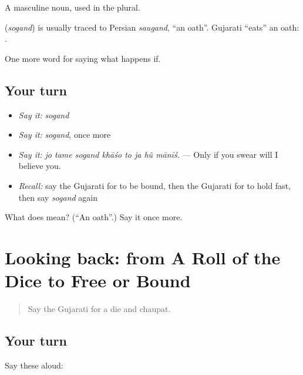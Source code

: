 A masculine noun, used in the plural.

\begin{cousinweb}
\textbf{} (\emph{sogand}) is usually traced to Persian \emph{saugand}, \textquotedblleft{}an oath\textquotedblright{}. Gujarati \textquotedblleft{}eats\textquotedblright{} an oath: \textbf{ }.
\end{cousinweb}

\begin{grammarlens}[title={What you've built}]
One more word for saying what happens if.
\end{grammarlens}

\subsection*{Your turn}
\begin{itemize}
\raggedright
  \item \emph{Say it:} \emph{sogand}
  \item \emph{Say it:} \emph{sogand}, once more
  \item \emph{Say it:} \emph{jo tame sogand khāśo to ja hũ mānīś.} — Only if you swear will I believe you.
  \item \emph{Recall:} say the Gujarati for to be bound, then the Gujarati for to hold fast, then say \emph{sogand} again
\end{itemize}

\begin{tcolorbox}[breakable,colback=teal!4,colframe=teal!35!black,title={Before you move on}]
What does  mean? (\textquotedblleft{}An oath\textquotedblright{}.) Say it once more.
\end{tcolorbox}
\section[(dialogue)]{Looking back: from A Roll of the Dice to Free or Bound}

\label{lesson:GU-R540-review-533-540}



\begin{quote}
Say the Gujarati for a die and chaupat.
\end{quote}

\subsection*{Your turn}
Say these aloud:

